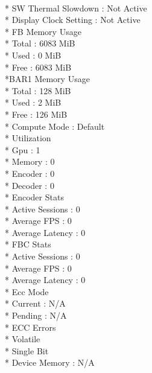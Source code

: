 \documentclass{article}
\begin{document}
      \\*   SW Thermal Slowdown               : Not Active
      \\*   Display Clock Setting             : Not Active
    \\* FB Memory Usage
    \\*     Total                             : 6083 MiB
     \\*    Used                              : 0 MiB
      \\*   Free                              : 6083 MiB
     \\*BAR1 Memory Usage
   \\*      Total                             : 128 MiB
    \\*     Used                              : 2 MiB
   \\*      Free                              : 126 MiB
   \\*  Compute Mode                          : Default
   \\*  Utilization
    \\*     Gpu                               : 1 %
     \\*    Memory                            : 0 %
      \\*   Encoder                           : 0 %
     \\*    Decoder                           : 0 %
    \\* Encoder Stats
     \\*    Active Sessions                   : 0
     \\*    Average FPS                       : 0
       \\*  Average Latency                   : 0
    \\* FBC Stats
     \\*    Active Sessions                   : 0
     \\*    Average FPS                       : 0
    \\*     Average Latency                   : 0
    \\* Ecc Mode
    \\*     Current                           : N/A
   \\*      Pending                           : N/A
   \\*  ECC Errors
    \\*     Volatile
    \\*         Single Bit            
    \\*             Device Memory             : N/A
\end{document}
